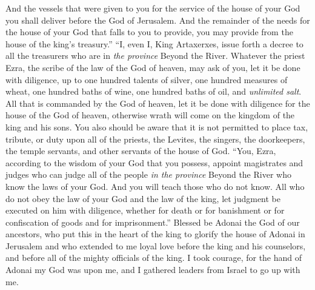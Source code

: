 \begin{biblechapter}
\verse And the vessels that were given to you for the service of the house of your God you shall deliver before the God of Jerusalem.
\verse And the remainder of the needs for the house of your God that falls to you to provide, you may provide from the house of the king’s treasury.”
\verse “I, even I, King Artaxerxes, issue forth a decree to all the treasurers who are in \textit{the province} Beyond the River. Whatever the priest Ezra, the scribe of the law of the God of heaven, may ask of you, let it be done with diligence,
\verse up to one hundred talents of silver, one hundred measures of wheat, one hundred baths of wine, one hundred baths of oil, and \textit{unlimited salt}.
\verse All that is commanded by the God of heaven, let it be done with diligence for the house of the God of heaven, otherwise wrath will come on the kingdom of the king and his sons.
\verse You also should be aware that it is not permitted to place tax, tribute, or duty upon all of the priests, the Levites, the singers, the doorkeepers, the temple servants, and other servants of the house of God.
\verse “You, Ezra, according to the wisdom of your God that you possess, appoint magistrates and judges who can judge all of the people \textit{in the province} Beyond the River who know the laws of your God. And you will teach those who do not know.
\verse All who do not obey the law of your God and the law of the king, let judgment be executed on him with diligence, whether for death or for banishment or for confiscation of goods and for imprisonment.”
\verse Blessed be Adonai the God of our ancestors, who put this in the heart of the king to glorify the house of Adonai in Jerusalem
\verse and who extended to me loyal love before the king and his counselors, and before all of the mighty officials of the king. I took courage, for the hand of Adonai my God was upon me, and I gathered leaders from Israel to go up with me.
\end{biblechapter}


